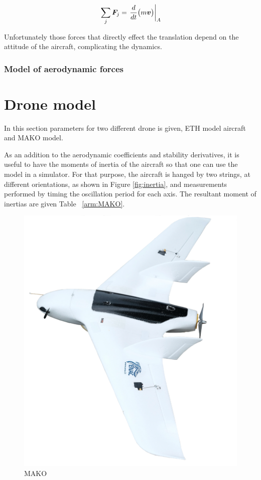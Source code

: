 \begin{equation}{\label{eqn:newtonsSecondLaw}}
\sum_j \bm{F}_j = \left. \frac{d}{dt} \big( m \bm{v} \big) \right|_A 
\end{equation}

Unfortunately those forces that directly effect the translation depend on the attitude of the aircraft, complicating the dynamics.

\subsubsection{Model of aerodynamic forces}




\section{Drone model}


In this section parameters for two different drone is given, ETH model aircraft and MAKO model. 

As an addition to the aerodynamic coefficients and stability derivatives, it is useful to have the moments of inertia of the aircraft so that one can use the model in a simulator. 
For that purpose, the aircraft is hanged by two strings, at different orientations, as shown in Figure \ref{fig:inertia}, and measurements performed by timing the oscillation period for each axis. 
The resultant moment of inertias are given Table ~\ref{arm:MAKO}. 

\begin{figure}
\centering
\includegraphics[width=0.7\columnwidth]{figures/makoEmptyBack}
\caption{MAKO}
\label{figure:mako}
\end{figure}


